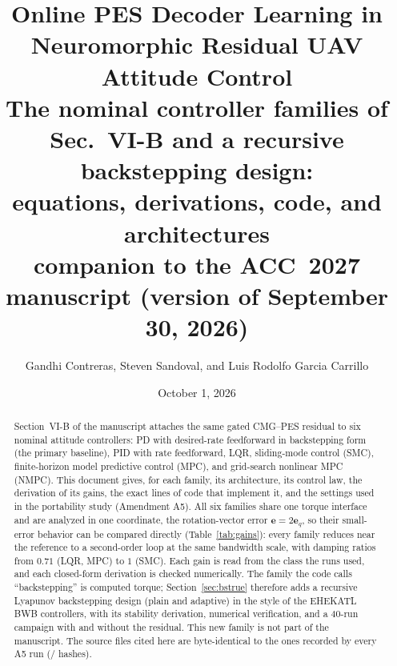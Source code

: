 \documentclass[11pt]{article}
\title{Online PES Decoder Learning in Neuromorphic Residual UAV Attitude Control\\[4pt]
\large The nominal controller families of Sec.~VI-B\ifwithbs{} and a recursive backstepping design\fi:\\ equations, derivations, code, and architectures\\
\normalsize companion to the ACC~2027 manuscript (version of September 30, 2026)}
\author{Gandhi Contreras, Steven Sandoval, and Luis Rodolfo Garcia Carrillo}
\date{October 1, 2026}
\theoremstyle{remark}
\newif\ifwithbs \withbstrue
\begin{document}
\maketitle

\begin{abstract}
Section~VI-B of the manuscript attaches the same gated CMG--PES residual to six nominal attitude controllers: PD with
desired-rate feedforward in backstepping form (the primary baseline), PID with rate feedforward, LQR, sliding-mode control
(SMC), finite-horizon model predictive control (MPC), and grid-search nonlinear MPC (NMPC). This document gives, for each
family, its architecture, its control law, the derivation of its gains, the exact lines of code that implement it, and the
settings used in the portability study (Amendment A5). All six families share one torque interface and are analyzed in one
coordinate, the rotation-vector error $\bm e=2\bm e_q$, so their small-error behavior can be compared directly
(Table~\ref{tab:gains}): every family reduces near the reference to a second-order loop at the same bandwidth scale, with
damping ratios from $0.71$ (LQR, MPC) to $1$ (SMC). Each gain is read from the class the runs used, and each closed-form
derivation is checked numerically.\ifwithbs{} The family the code calls ``backstepping'' is computed torque; Section~\ref{sec:bstrue}
therefore adds a recursive Lyapunov backstepping design (plain and adaptive) in the style of the EHEKATL BWB controllers,
with its stability derivation, numerical verification, and a 40-run campaign with and without the residual. This new
family is not part of the manuscript.\fi{} The source files cited here are byte-identical to the ones recorded by every A5 run
(\fhashMatch/\fhashChecked{} hashes).
\end{abstract}

\tableofcontents
\newpage

\end{document}
